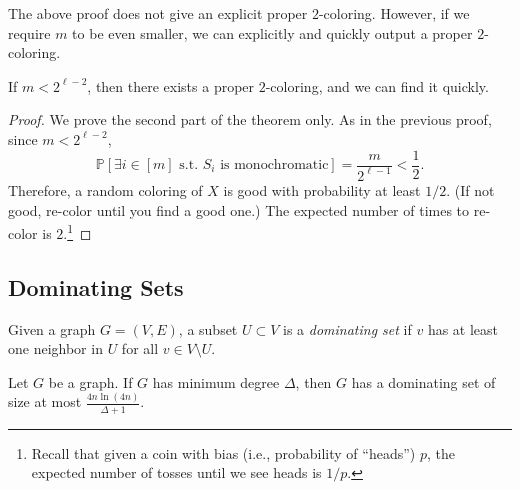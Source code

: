 \documentclass[letterpaper, reqno,11pt]{article}
\newcommand{\PP}{\mathbb{P}}
\begin{document}
The above proof does not give an explicit proper $2$-coloring. However, if we require $m$ to be even smaller, we can explicitly and quickly output a proper $2$-coloring.

\begin{theorem}
  If $m < 2^{\ell - 2}$, then there exists a proper $2$-coloring, and we can find it quickly.
\end{theorem}

\begin{proof}
  We prove the second part of the theorem only. As in the previous proof, since $m < 2^{\ell - 2}$,
  $$ \PP\left[\exists i \in [m] \text{ s.t.\ $S_i$ is monochromatic}\right] = \frac{m}{2^{\ell - 1}} < \frac{1}{2}. $$
  Therefore, a random coloring of $X$ is good with probability at least $1/2$. (If not good, re-color until you find a good one.) The expected number of times to re-color is $2$.\footnote{Recall that given a coin with bias (i.e., probability of ``heads'') $p$, the expected number of tosses until we see heads is $1/p$.}
\end{proof}

\subsection{Dominating Sets}

\begin{definition}
  Given a graph $G = (V, E)$, a subset $U \subset V$ is a \emph{dominating set} if $v$ has at least one neighbor in $U$ for all $v \in V \setminus U$.
\end{definition}

\begin{theorem}
  Let $G$ be a graph. If $G$ has minimum degree $\Delta$, then $G$ has a dominating set of size at most $\frac{4n\ln(4n)}{\Delta + 1}$.
\end{theorem}
\end{document}

